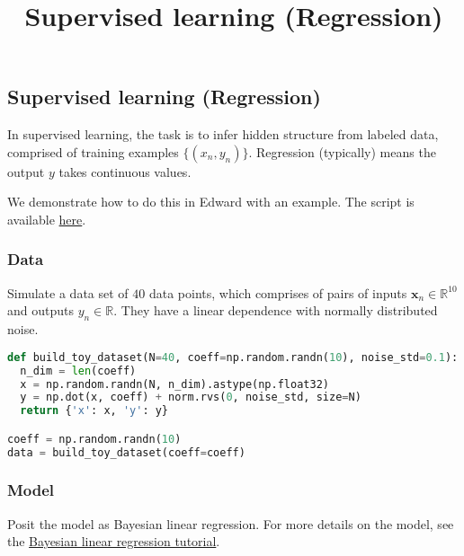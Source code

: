 \title{Supervised learning (Regression)}

\subsection{Supervised learning (Regression)}

In supervised learning, the task is to infer hidden structure from
labeled data, comprised of training examples $\{(x_n, y_n)\}$.
Regression (typically) means the output $y$ takes continuous values.

We demonstrate how to do this in Edward with an example.
The script is available
\href{https://github.com/blei-lab/edward/blob/master/examples/bayesian_linear_regression_test.py}
{here}.


\subsubsection{Data}

Simulate a data set of $40$ data points, which comprises of pairs of inputs $\mathbf{x}_n\in\mathbb{R}^{10}$ and outputs
$y_n\in\mathbb{R}$. They have a linear dependence with normally distributed noise.

\begin{lstlisting}[language=Python]
def build_toy_dataset(N=40, coeff=np.random.randn(10), noise_std=0.1):
  n_dim = len(coeff)
  x = np.random.randn(N, n_dim).astype(np.float32)
  y = np.dot(x, coeff) + norm.rvs(0, noise_std, size=N)
  return {'x': x, 'y': y}

coeff = np.random.randn(10)
data = build_toy_dataset(coeff=coeff)
\end{lstlisting}


\subsubsection{Model}

Posit the model as Bayesian linear regression. For more details on the
model, see the
\href{tut_bayesian_linear_regression}
{Bayesian linear regression tutorial}.

